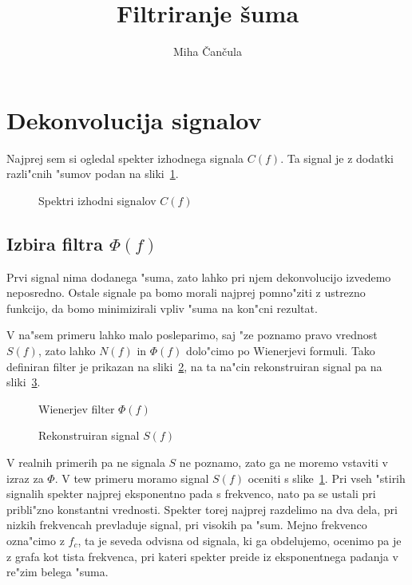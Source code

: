 \documentclass[a4paper,10pt]{article}
\title{Filtriranje \v suma}
\author{Miha \v Can\v cula}
\begin{document}
\maketitle

\section{Dekonvolucija signalov}

Najprej sem si ogledal spekter izhodnega signala $C(f)$. Ta signal je z dodatki razli"cnih "sumov podan na sliki~\ref{fig:signal-fft}. 

\begin{figure}[h]

\caption{Spektri izhodni signalov $C(f)$}
\label{fig:signal-fft}
\end{figure}

\subsection{Izbira filtra $\Phi(f)$}

Prvi signal nima dodanega "suma, zato lahko pri njem dekonvolucijo izvedemo neposredno. Ostale signale pa bomo morali najprej pomno"ziti z ustrezno funkcijo, da bomo minimizirali vpliv "suma na kon"cni rezultat. 

V na"sem primeru lahko malo posleparimo, saj "ze poznamo pravo vrednost $S(f)$, zato lahko $N(f)$ in $\Phi(f)$ dolo"cimo po Wienerjevi formuli. Tako definiran filter je prikazan na sliki~\ref{fig:signal-filter}, na ta na"cin rekonstruiran signal pa na sliki~\ref{fig:signal-rekonstruiran}. 

\begin{figure}[h]

\caption{Wienerjev filter $\Phi(f)$}
\label{fig:signal-filter}
\end{figure}

\begin{figure}[h]

\caption{Rekonstruiran signal $S(f)$}
\label{fig:signal-rekonstruiran}
\end{figure}

V realnih primerih pa ne signala $S$ ne poznamo, zato ga ne moremo vstaviti v izraz za $\Phi$. V tew primeru moramo signal $S(f)$ oceniti s slike~\ref{fig:signal-fft}. Pri vseh "stirih signalih spekter najprej eksponentno pada s frekvenco, nato pa se ustali pri pribli"zno konstantni vrednosti. Spekter torej najprej razdelimo na dva dela, pri nizkih frekvencah prevladuje signal, pri visokih pa "sum. Mejno frekvenco ozna"cimo z $f_c$, ta je seveda odvisna od signala, ki ga obdelujemo, ocenimo pa je z grafa kot tista frekvenca, pri kateri spekter preide iz eksponentnega padanja v re"zim belega "suma. 
\end{document}
